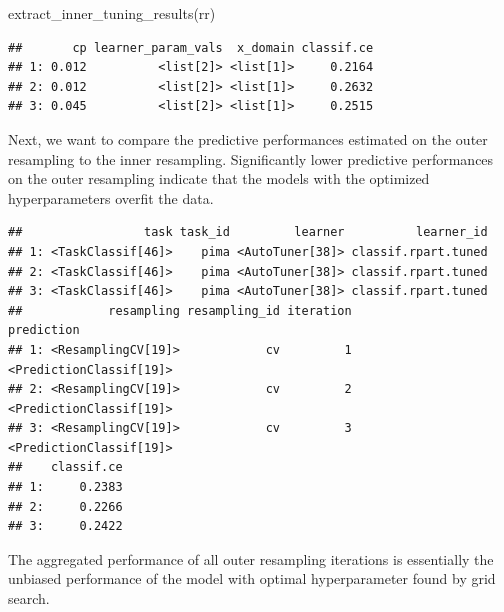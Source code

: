 \documentclass[
]{scrbook}
\newenvironment{Shaded}{\begin{snugshade}}{\end{snugshade}}
\newcommand{\FunctionTok}[1]{\textcolor[rgb]{0.00,0.00,0.00}{#1}}
\newcommand{\NormalTok}[1]{#1}
\newcommand{\SpecialCharTok}[1]{\textcolor[rgb]{0.00,0.00,0.00}{#1}}
\renewenvironment{Shaded} {\begin{snugshade}\small} {\end{snugshade}}
\begin{document}
\begin{Shaded}
\begin{Highlighting}[]
\FunctionTok{extract\_inner\_tuning\_results}\NormalTok{(rr)}
\end{Highlighting}
\end{Shaded}

\begin{verbatim}
##       cp learner_param_vals  x_domain classif.ce
## 1: 0.012          <list[2]> <list[1]>     0.2164
## 2: 0.012          <list[2]> <list[1]>     0.2632
## 3: 0.045          <list[2]> <list[1]>     0.2515
\end{verbatim}

Next, we want to compare the predictive performances estimated on the outer resampling to the inner resampling.
Significantly lower predictive performances on the outer resampling indicate that the models with the optimized hyperparameters overfit the data.

\begin{Shaded}
\end{Shaded}

\begin{verbatim}
##                 task task_id         learner          learner_id
## 1: <TaskClassif[46]>    pima <AutoTuner[38]> classif.rpart.tuned
## 2: <TaskClassif[46]>    pima <AutoTuner[38]> classif.rpart.tuned
## 3: <TaskClassif[46]>    pima <AutoTuner[38]> classif.rpart.tuned
##            resampling resampling_id iteration              prediction
## 1: <ResamplingCV[19]>            cv         1 <PredictionClassif[19]>
## 2: <ResamplingCV[19]>            cv         2 <PredictionClassif[19]>
## 3: <ResamplingCV[19]>            cv         3 <PredictionClassif[19]>
##    classif.ce
## 1:     0.2383
## 2:     0.2266
## 3:     0.2422
\end{verbatim}

The aggregated performance of all outer resampling iterations is essentially the unbiased performance of the model with optimal hyperparameter found by grid search.

\begin{Shaded}
\end{Shaded}
\end{document}
